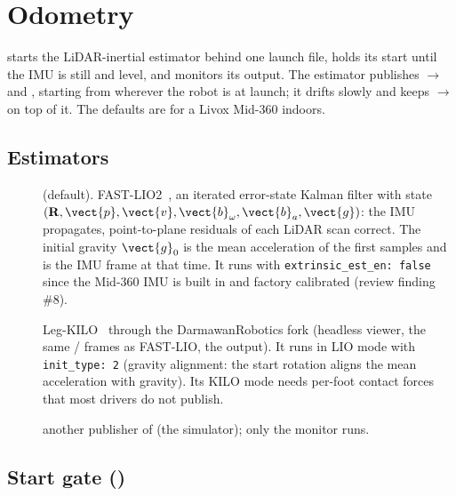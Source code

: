 \chapter{Odometry}
\label{ch:odometry}

 starts the LiDAR-inertial estimator behind one launch file, holds its
start until the IMU is still and level, and monitors its output. The estimator publishes
$\to$ and , starting from wherever the robot is at
launch; it drifts slowly and  keeps $\to$ on top of
it. The defaults are for a Livox Mid-360 indoors.

\section{Estimators}

\begin{description}
  \item[] (default). FAST-LIO2~\cite{xu2022fastlio2}, an iterated
    error-state Kalman filter with state $(\mathbf{R}, \vect{p}, \vect{v}, \vect{b}_\omega,
    \vect{b}_a, \vect{g})$: the IMU propagates, point-to-plane residuals of each LiDAR scan
    correct. The initial gravity $\vect{g}_0$ is the mean acceleration of the first samples and
     is the IMU frame at that time. It runs with \texttt{extrinsic\_est\_en: false}
    since the Mid-360 IMU is built in and factory calibrated (review finding \#8).
  \item[] Leg-KILO~\cite{ou2024legkilo} through the DarmawanRobotics fork
    (headless viewer, the same / frames as FAST-LIO, the
     output). It runs in LIO mode with \texttt{init\_type: 2}
    (gravity alignment: the start rotation aligns the mean acceleration with gravity). Its KILO
    mode needs per-foot contact forces that most drivers do not publish.
  \item[] another publisher of  (the simulator); only the
    monitor runs.
\end{description}

\section{Start gate ()}
\label{sec:wait-still}


